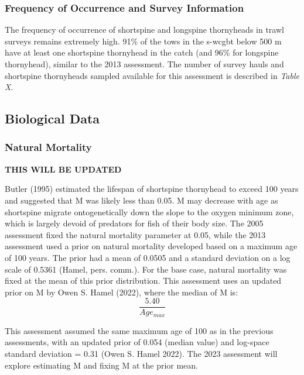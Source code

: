 \documentclass[11pt,
  english,
  letterpaper,
]{article}
\begin{document}
\hypertarget{frequency-of-occurrence-and-survey-information}{%
\subsubsection{Frequency of Occurrence and Survey Information}\label{frequency-of-occurrence-and-survey-information}}

The frequency of occurrence of shortspine and longspine thornyheads in trawl surveys remains extremely high. 91\% of the tows in the \gls{s-wcgbt} below 500 m have at least one shortspine thornyhead in the catch (and 96\% for longspine thornyhead), similar to the 2013 assessment. The number of survey hauls and shortspine thornyheads sampled available for this assessment is described in \emph{Table X}.

\hypertarget{biological-data}{%
\subsection{Biological Data}\label{biological-data}}

\hypertarget{natural-mortality}{%
\subsubsection{Natural Mortality}\label{natural-mortality}}

\textbf{THIS WILL BE UPDATED}

Butler (1995) estimated the lifespan of shortspine thornyhead to exceed 100 years and suggested that M was likely less than 0.05. M may decrease with age as shortspine migrate ontogenetically down the slope to the oxygen minimum zone, which is largely devoid of predators for fish of their body size. The 2005 assessment fixed the natural mortality parameter at 0.05, while the 2013 assessment used a prior on natural mortality developed based on a maximum age of 100 years. The prior had a mean of 0.0505 and a standard deviation on a log scale of 0.5361 (Hamel, pers. comm.). For the base case, natural mortality was fixed at the mean of this prior distribution. This assessment uses an updated prior on M by Owen S. Hamel (2022), where the median of M is: \begin{equation} \frac{5.40}{Age_{max}} \end{equation}

This assessment assumed the same maximum age of 100 as in the previous assessments, with an updated prior of 0.054 (median value) and log-space standard deviation = 0.31 (Owen S. Hamel 2022). The 2023 assessment will explore estimating M and fixing M at the prior mean.
\end{document}
